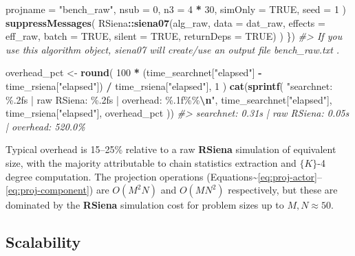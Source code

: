 \documentclass[
]{article}
\newenvironment{Shaded}{\begin{snugshade}}{\end{snugshade}}
\newcommand{\AttributeTok}[1]{\textcolor[rgb]{0.13,0.29,0.53}{#1}}
\newcommand{\CommentTok}[1]{\textcolor[rgb]{0.56,0.35,0.01}{\textit{#1}}}
\newcommand{\ConstantTok}[1]{\textcolor[rgb]{0.56,0.35,0.01}{#1}}
\newcommand{\DecValTok}[1]{\textcolor[rgb]{0.00,0.00,0.81}{#1}}
\newcommand{\FunctionTok}[1]{\textcolor[rgb]{0.13,0.29,0.53}{\textbf{#1}}}
\newcommand{\NormalTok}[1]{#1}
\newcommand{\OtherTok}[1]{\textcolor[rgb]{0.56,0.35,0.01}{#1}}
\newcommand{\SpecialCharTok}[1]{\textcolor[rgb]{0.81,0.36,0.00}{\textbf{#1}}}
\newcommand{\StringTok}[1]{\textcolor[rgb]{0.31,0.60,0.02}{#1}}
\begin{document}
\begin{Shaded}
\begin{Highlighting}[]
    \AttributeTok{projname =} \StringTok{"bench\_raw"}\NormalTok{,}
    \AttributeTok{nsub =} \DecValTok{0}\NormalTok{, }\AttributeTok{n3 =} \DecValTok{4} \SpecialCharTok{*} \DecValTok{30}\NormalTok{, }\AttributeTok{simOnly =} \ConstantTok{TRUE}\NormalTok{, }\AttributeTok{seed =} \DecValTok{1}
\NormalTok{  )}
  \FunctionTok{suppressMessages}\NormalTok{(}
\NormalTok{    RSiena}\SpecialCharTok{::}\FunctionTok{siena07}\NormalTok{(alg\_raw, }\AttributeTok{data =}\NormalTok{ dat\_raw, }\AttributeTok{effects =}\NormalTok{ eff\_raw,}
                    \AttributeTok{batch =} \ConstantTok{TRUE}\NormalTok{, }\AttributeTok{silent =} \ConstantTok{TRUE}\NormalTok{, }\AttributeTok{returnDeps =} \ConstantTok{TRUE}\NormalTok{)}
\NormalTok{  )}
\NormalTok{\})}
\CommentTok{\#\textgreater{} If you use this algorithm object, siena07 will create/use an output file bench\_raw.txt .}

\NormalTok{overhead\_pct }\OtherTok{\textless{}{-}} \FunctionTok{round}\NormalTok{(}
  \DecValTok{100} \SpecialCharTok{*}\NormalTok{ (time\_searchnet[}\StringTok{"elapsed"}\NormalTok{] }\SpecialCharTok{{-}}\NormalTok{ time\_rsiena[}\StringTok{"elapsed"}\NormalTok{]) }\SpecialCharTok{/}
\NormalTok{    time\_rsiena[}\StringTok{"elapsed"}\NormalTok{], }\DecValTok{1}
\NormalTok{)}
\FunctionTok{cat}\NormalTok{(}\FunctionTok{sprintf}\NormalTok{(}
  \StringTok{"searchnet: \%.2fs | raw RSiena: \%.2fs | overhead: \%.1f\%\%}\SpecialCharTok{\textbackslash{}n}\StringTok{"}\NormalTok{,}
\NormalTok{  time\_searchnet[}\StringTok{"elapsed"}\NormalTok{], time\_rsiena[}\StringTok{"elapsed"}\NormalTok{], overhead\_pct}
\NormalTok{))}
\CommentTok{\#\textgreater{} searchnet: 0.31s | raw RSiena: 0.05s | overhead: 520.0\%}
\end{Highlighting}
\end{Shaded}

Typical overhead is 15--25\% relative to a raw \textbf{RSiena}
simulation of equivalent size, with the majority attributable to chain
statistics extraction and \(\{K\}\)-4 degree computation. The projection
operations
(Equations\textasciitilde{}\ref{eq:proj-actor}--\ref{eq:proj-component})
are \(O(M^2 N)\) and \(O(M N^2)\) respectively, but these are dominated
by the \textbf{RSiena} simulation cost for problem sizes up to
\(M, N \approx 50\).

\subsection{Scalability}\label{scalability}
\end{document}
